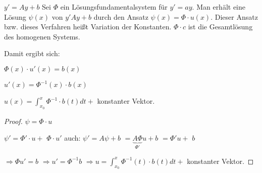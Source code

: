 \begin{satz}
$y' = Ay+b$ Sei $\Phi$ ein Lösungsfundamentalsystem für $y' = ay$. Man erhält eine Lösung $\psi(x)$
von $y'Ay + b$ durch den Ansatz $ \psi (x) = \Phi \cdot u(x)$. Dieser Ansatz bzw. dieses Verfahren heißt Variation der Konstanten. $\Phi \cdot c$ ist die Gesamtlösung des homogenen Systems. 

Damit ergibt sich: 

$\Phi(x) \cdot u'(x) = b(x)$

$u'(x) = \Phi^{-1}(x) \cdot b(x)$

$u(x) = \int_{x_0}^{x} \Phi^{-1} \cdot b(t) dt + $ konstanter Vektor.
\end{satz}

\begin{proof}
$\psi = \Phi \cdot u$

$\psi' = \Phi' \cdot u + $
\color{red}
\underline{$\Phi \cdot u'$}
\color{black}
auch: $\psi' = A\psi + b $
$=\underbrace{A \Phi}_{\Phi'} u + b$
$=\Phi' u + $
\color{red}
\underline{$b$}
\color{black}

$\Rightarrow \Phi u' = b$
$\Rightarrow u' = \Phi^{-1} b$
$\Rightarrow u = \int_{x_0}^{x} \Phi^{-1} (t) \cdot b(t) dt + $ konstanter Vektor. 
\end{proof}
